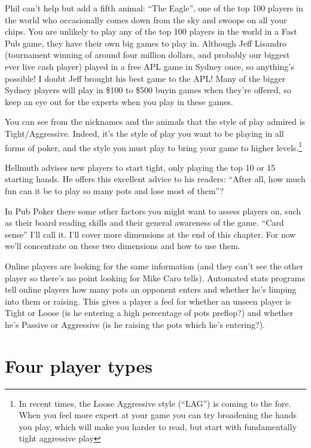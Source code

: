 Phil can't help but add a fifth animal: ``The Eagle'', one of the
top 100 players in the world who occasionally comes down from
the sky and swoops on all your chips. You are unlikely to play
any of the top 100 players in the world in a Fast Pub game, they
have their own big games to play in. Although Jeff Lisandro
(tournament winning of around four million dollars, and
probably our biggest ever live cash player) played in
a free APL game in Sydney once, so anything's possible! I doubt
Jeff brought his best game to the APL! Many
of the bigger Sydney players will play in \$100 to \$500 buyin
games when they're offered, so keep an eye out for the experts
when you play in these games.

You can see from the nicknames and the animals that the style
of play admired is Tight/Aggressive. Indeed,
it's the style of play you want to be playing in all forms of
poker, and the style you must play to bring your game to higher
levels.\footnote{In recent times, the Loose Aggressive style
(``LAG'') is coming to the fore. When you feel more expert
at your game you can try broadening the hands you play, which
will make you harder to read, but start with fundamentally
tight aggressive play}

Hellmuth advises new players to start tight, only playing the
top 10 or 15 starting hands. He offers this excellent
advice to his readers: ``After all, how much fun can it be to
play so many pots and lose most of them''?

In Pub Poker there some other factors you might want to assess
players on, such as their board reading skills and their general
awareness of the game. ``Card sense'' I'll call it.  I'll cover more
dimensions at the end of this chapter. For now we'll concentrate on these
two dimensions and how to use them.

Online players are looking for the same information (and they
can't see the other player so there's no point looking for Mike Caro
tells). Automated stats programs tell online players how many pots an
opponent enters and whether he's limping into them or raising. This
gives a player a feel for whether an unseen player is Tight or Loose
(is he entering a high percentage of pots preflop?) and whether he's
Passive or Aggressive (is he raising the pots which he's entering?).


\section{Four player types}

